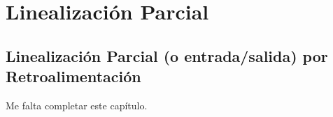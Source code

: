 \chapter{Linealización Parcial}
\section{Linealización Parcial (o entrada/salida) por Retroalimentación}

Me falta completar este capítulo.


